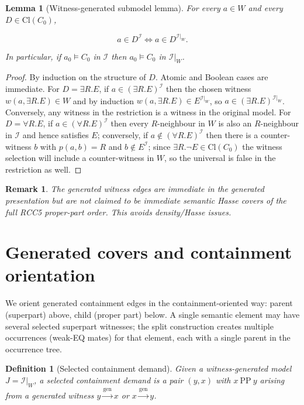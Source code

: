 \documentclass[11pt]{article}
\newcommand{\PP}{\mathrm{PP}}
\newcommand{\Cl}{\mathrm{Cl}}
\newtheorem{lemma}[theorem]{Lemma}
\newtheorem{definition}[theorem]{Definition}
\newtheorem{remark}[theorem]{Remark}
\begin{document}
\begin{lemma}[Witness-generated submodel lemma]
\label{lem:witness-generated}
For every $a\in W$ and every $D\in\Cl(C_0)$,


\[
a\in D^\mathcal{I} \iff a\in D^{\mathcal{I}|_W}.
\]


In particular, if $a_0\models C_0$ in $\mathcal{I}$ then $a_0\models C_0$ in $\mathcal{I}|_W$.
\end{lemma}

\begin{proof}
By induction on the structure of $D$. Atomic and Boolean cases are immediate.
For $D=\exists R.E$, if $a\in(\exists R.E)^\mathcal{I}$ then the chosen witness
$w(a,\exists R.E)\in W$ and by induction $w(a,\exists R.E)\in E^{\mathcal{I}|_W}$,
so $a\in(\exists R.E)^{\mathcal{I}|_W}$. Conversely, any witness in the
restriction is a witness in the original model. For $D=\forall R.E$, if
$a\in(\forall R.E)^\mathcal{I}$ then every $R$-neighbour in $W$ is also an
$R$-neighbour in $\mathcal{I}$ and hence satisfies $E$; conversely, if
$a\notin(\forall R.E)^\mathcal{I}$ then there is a counter-witness $b$ with
$p(a,b)=R$ and $b\notin E^\mathcal{I}$; since $\exists R.\neg E\in\Cl(C_0)$
the witness selection will include a counter-witness in $W$, so the universal
is false in the restriction as well.
\end{proof}

\begin{remark}
The generated witness edges are \emph{immediate} in the generated presentation
but are not claimed to be immediate semantic Hasse covers of the full RCC5
proper-part order. This avoids density/Hasse issues.
\end{remark}

\section{Generated covers and containment orientation}
\label{sec:generated-covers}

We orient generated containment edges in the containment-oriented way:
parent (superpart) above, child (proper part) below. A single semantic element
may have several selected superpart witnesses; the split construction creates
multiple occurrences (weak-EQ mates) for that element, each with a single
parent in the occurrence tree.

\begin{definition}[Selected containment demand]
Given a witness-generated model $J=\mathcal{I}|_W$, a selected containment
demand is a pair $(y,x)$ with $x\ \PP\ y$ arising from a generated witness
$y\overset{\mathrm{gen}}{\to} x$ or $x\overset{\mathrm{gen}}{\to} y$.
\end{definition}
\end{document}
